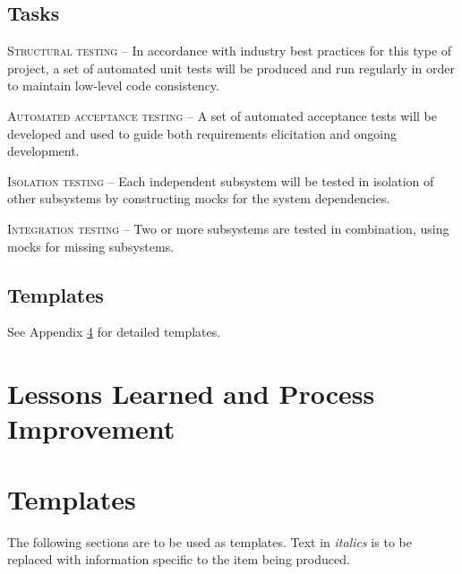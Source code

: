 \documentclass[11pt]{wacomepd}
\begin{document}
\section {Tasks}
\textsc{Structural testing} -- In accordance with industry best practices for this type of project,
a set of automated unit tests will be produced and run regularly in order to maintain low-level code
consistency.

\textsc{Automated acceptance testing} -- A set of automated acceptance tests will be developed and
used to guide both requirements elicitation and ongoing development.

\textsc{Isolation testing} -- Each independent subsystem will be tested in isolation of other
subsystems by constructing mocks for the system dependencies.

\textsc{Integration testing} -- Two or more subsystems are tested in combination, using mocks for
missing subsystems.


\section{Templates}
See Appendix \ref{appA} for detailed templates.

\chapter{Lessons Learned and Process Improvement}


\clearpage
\appendix
\chapter{Templates}
\label{appA}
The following sections are to be used as templates.  Text in \textit{italics} is to be replaced with
information specific to the item being produced.
\end{document}
